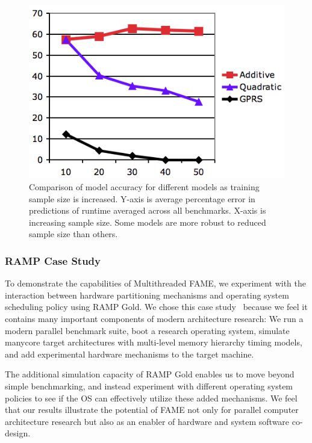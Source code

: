 \begin{figure}
	\centering
	\includegraphics[scale = 0.5] {acc_sample.png}
	\caption{ \small Comparison of model accuracy for different models as training sample size is increased.  Y-axis is average percentage error in predictions of runtime averaged across all benchmarks. X-axis is increasing sample size.  Some models are more robust to reduced sample size than others.}
	\label{fig:acc-sample}
\end{figure}


\subsubsection*{RAMP Case Study}

To demonstrate the capabilities of Multithreaded FAME, we experiment
with the interaction between hardware partitioning mechanisms and
operating system scheduling policy using RAMP Gold.  We chose this
case study~\cite{bird,tess_resource} because we feel it contains many important
components of modern architecture research:  We run a modern
parallel benchmark suite, boot a research operating system, simulate
manycore target architectures with multi-level memory hierarchy timing
models, and add experimental hardware mechanisms to the target
machine.

The additional simulation capacity of RAMP Gold enables us to move
beyond simple benchmarking, and instead experiment with different
operating system policies to see if the OS can effectively utilize
these added mechanisms.  We feel that our results illustrate the
potential of FAME not only for parallel computer architecture research
but also as an enabler of hardware and system software co-design.

